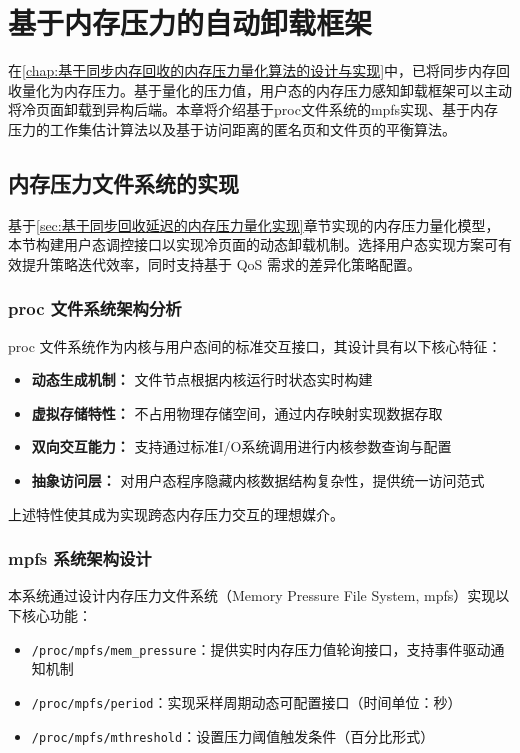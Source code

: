 \chapter{基于内存压力的自动卸载框架}
\label{chap:基于内存压力的自动卸载框架}
在\ref{chap:基于同步内存回收的内存压力量化算法的设计与实现}中，已将同步内存回收量化为内存压力。基于量化的压力值，用户态的内存压力感知卸载框架可以主动将冷页面卸载到异构后端。本章将介绍基于proc文件系统的mpfs实现、基于内存压力的工作集估计算法以及基于访问距离的匿名页和文件页的平衡算法。


\section{内存压力文件系统的实现}
\label{sec:mpfs_implementation}

基于\ref{sec:基于同步回收延迟的内存压力量化实现}章节实现的内存压力量化模型，本节构建用户态调控接口以实现冷页面的动态卸载机制。选择用户态实现方案可有效提升策略迭代效率，同时支持基于 QoS 需求的差异化策略配置。

\subsection{proc 文件系统架构分析}

proc 文件系统作为内核与用户态间的标准交互接口，其设计具有以下核心特征：

\begin{itemize}
    \item \textbf{动态生成机制：} 文件节点根据内核运行时状态实时构建
    \item \textbf{虚拟存储特性：} 不占用物理存储空间，通过内存映射实现数据存取
    \item \textbf{双向交互能力：} 支持通过标准I/O系统调用进行内核参数查询与配置
    \item \textbf{抽象访问层：} 对用户态程序隐藏内核数据结构复杂性，提供统一访问范式
\end{itemize}

上述特性使其成为实现跨态内存压力交互的理想媒介。

\subsection{mpfs 系统架构设计}

本系统通过设计内存压力文件系统（Memory Pressure File System, mpfs）实现以下核心功能：

\begin{itemize}
    \item \texttt{/proc/mpfs/mem\_pressure}：提供实时内存压力值轮询接口，支持事件驱动通知机制
    \item \texttt{/proc/mpfs/period}：实现采样周期动态可配置接口（时间单位：秒）
    \item \texttt{/proc/mpfs/mthreshold}：设置压力阈值触发条件（百分比形式）
\end{itemize}


